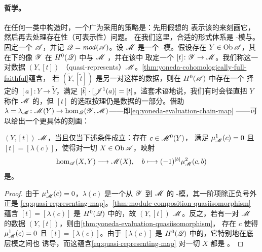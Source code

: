 \paragraph{哲学。}\label{sub:philosophy}
在任何一类\trCategory{}中构造\trObject{}时，一个广为采用的策略是：先用假想的%
表示该\trObject{}的\trFunctor{}来刻画它，然后再去处理存在性（可表示性）问题。
在我们这里，合适的形式体系是 \trAinfty-模与\trYonedaEmbedding。固定一个%
\trACategory{} $\mathscr{A}$，并记 $\mathscr{Q}=\mathit{mod}(\mathscr{A})$。设 $\mathscr{M}$ 是一个%
\trAinfty-模。假设存在 $Y\in\operatorname{Ob}\mathscr{A}$，其在\trYonedaEmbedding{}下的像%
$\mathscr{Y}$ 在 $H^0(\mathscr{Q})$ 中与 $\mathscr{M}$ \trIsomorphic，并在该\trCategory{}中%
取定一个\trIsomorphism{} $[t]\colon\mathscr{Y}\to\mathscr{M}$。我们称这一对数据%
$(Y,[t])$ \textbf{\trQuasiRepresent}（quasi-represents）$\mathscr{M}$。\cref{thm:yoneda-cohomologically-full-faithful}蕴含，
若 $(\tilde{Y},[\tilde{t}])$ 是另一对这样的数据，则在 $H^0(\mathscr{A})$ 中存在一个%
择定的\trIsomorphism{} $[a]\colon Y\to\tilde{Y}$，满足
$[\tilde{t}]\cdot[\mathscr{J}^1(a)]=[t]$。滥套术语地说，我们有时会径直把 $Y$ 称作%
\trQuasiRepresent{} $\mathscr{M}$ 的\trObject，但 $[t]$ 的选取按理仍是数据的一部分。借助%
\trChainMap{} $\lambda=\lambda_{\mathscr{M}}\colon\mathscr{M}(Y)
\to\hom_{\mathscr{Q}}(\mathscr{Y},\mathscr{M})$——即\eqref{eq:yoneda-evaluation-chain-map}
——可以给出一个更具体的刻画：

\begin{lemma}\label{thm:quasi-represents-characterization}
$(Y,[t])$ \trQuasiRepresent{} $\mathscr{M}$，当且仅当下述条件成立：存在 $c\in\mathscr{M}^0(Y)$，%
满足 $\mu^1_{\mathscr{M}}(c)=0$ 且 $[t]=[\lambda(c)]$，使得对一切 $X\in\operatorname{Ob}\mathscr{A}$，映射
\begin{equation}\label{eq:quasi-representing-map}
\hom_{\mathscr{A}}(X,Y)\longrightarrow\mathscr{M}(X),\quad
b\longmapsto(-1)^{|b|}\mu^2_{\mathscr{M}}(c,b)
\end{equation}
是\trQuasiisomorphism。
\end{lemma}

\begin{proof}
由于 $\mu^1_{\mathscr{M}}(c)=0$，$\lambda(c)$ 是一个从 $\mathscr{Y}$ 到 $\mathscr{M}$ 的%
\trAinfty-模\trHomomorphism，其一阶项除正负号外正是
\eqref{eq:quasi-representing-map}。\cref{thm:module-composition-quasiisomorphism}
蕴含 $[t]=[\lambda(c)]$ 是 $H^0(\mathscr{Q})$ 中的\trIsomorphism，故 $(Y,[t])$ \trQuasiRepresent%
$\mathscr{M}$。反之，若有一对\trQuasiRepresent{} $\mathscr{M}$ 的数据 $(Y,[t])$，则由\cref{thm:yoneda-evaluation-quasiisomorphism}，%
存在 $c$ 使得 $\mu^1_{\mathscr{M}}(c)=0$ 且 $[t]=[\lambda(c)]$。由于 $[\lambda(c)]$
是 $H^0(\mathscr{Q})$ 中的\trIsomorphism，它特别地在底层\trCohomology{}模之间也%
诱导\trIsomorphism，而这蕴含\eqref{eq:quasi-representing-map} 对一切 $X$ 都是%
\trQuasiisomorphism。
\end{proof}
